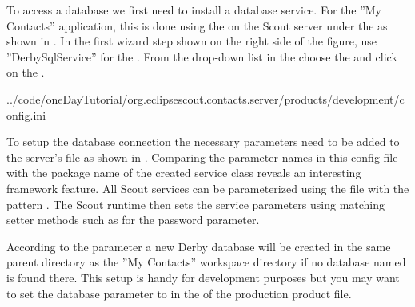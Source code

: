 \documentclass[a4paper,10pt,twoside]{book}
\begin{document}
To access a database we first need to install a database service. 
For the ''My Contacts'' application, this is done using the  on the Scout server under the  as shown in .
In the first wizard step shown on the right side of the figure, use ''DerbySqlService'' for the .
From the drop-down list in the  choose the  and click on the .


{../code/oneDayTutorial/org.eclipsescout.contacts.server/products/development/config.ini}

To setup the database connection the necessary parameters need to be added to the server's  file as shown in .
Comparing the parameter names in this config file with the package name of the created  service class reveals an interesting framework feature. 
All Scout services can be parameterized using the  file with the pattern . 
The Scout runtime then sets the service parameters using matching setter methods such as  for the password parameter.  

According to the parameter  a new Derby database will be created in the same parent directory as the ''My Contacts'' workspace directory if no database named  is found there.
This setup is handy for development purposes but you may want to set the database parameter to  in the  of the production product file. 
\end{document}
